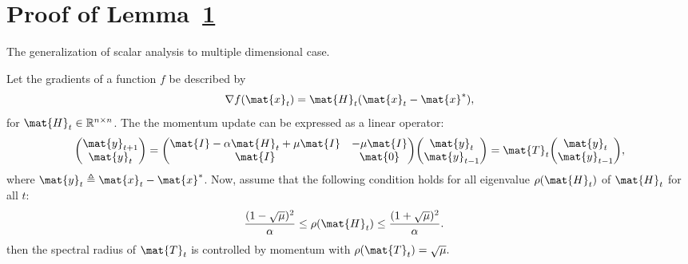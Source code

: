 \section{Proof of Lemma~\ref{}}
The generalization of scalar analysis to multiple dimensional case.
\begin{lemma}
\label{lem:robustness}
Let the gradients of a function $f$ be described by
\begin{equation}
	\nabla f(\mat{x}_t) = \mat{H}_t (\mat{x}_t - \mat{x}^*),
\end{equation}
for $\mat{H}_t \in \mathbb{R}^{n\times n}$.
The the momentum update can be expressed as a linear operator:
\begin{align}
{\begin{pmatrix}
\mat{y}_{t+1}\\
\mat{y}_t \\
\end{pmatrix}}
=
{\begin{pmatrix}
\mat{I}-\alpha \mat{H}_t + \mu \mat{I} & - \mu \mat{I} \\
\mat{I} & \mat{0} \\
\end{pmatrix}}
{\begin{pmatrix}
\mat{y}_t \\
\mat{y}_{t-1} \\
\end{pmatrix}}
=\mat{T}_t
{\begin{pmatrix}
\mat{y}_t \\
\mat{y}_{t-1} \\
\end{pmatrix}},
\end{align}
where $\mat{y}_t\triangleq \mat{x}_t - \mat{x}^*$.
Now, assume that the following condition holds for all eigenvalue $\rho(\mat{H}_t)$ of $\mat{H}_t$ for all $t$:
\begin{align}
{(1-\sqrt{\mu})^2\over \alpha} &\leq \rho(\mat{H}_t ) \leq {(1+\sqrt{\mu})^2\over \alpha}.
\label{equ:control_condition}
\end{align}
then the spectral radius of $\mat{T}_t$ is controlled by momentum with
$	\rho(\mat{T}_t) = \sqrt{\mu}.$


\end{lemma}
